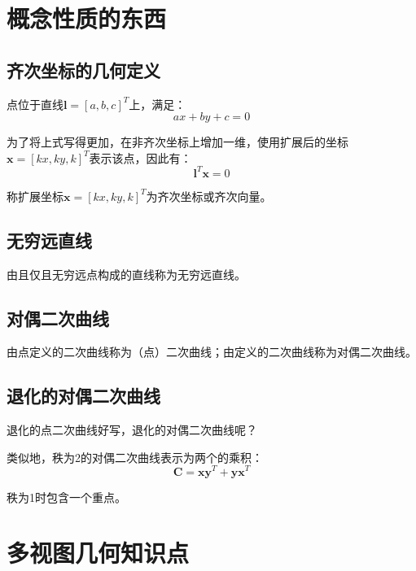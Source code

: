 \documentclass[11pt]{article}
\begin{document}

\setcounter{tocdepth}{3}
\tableofcontents
\newpage
{}
\section{概念性质的东西}
\subsection{齐次坐标的几何定义}
点位于直线$\mathbf{l}=[a,b,c]^T$上，满足：
\begin{equation*}
  ax+by+c=0
\end{equation*}\par
为了将上式写得更加，在非齐次坐标上增加一维，使用扩展后的坐标$\mathbf{x}=[kx,ky,k]^T$表示该点，因此有：
\begin{equation*}
  \mathbf{l}^T\mathbf{x}=0
\end{equation*}\par
称扩展坐标$\mathbf{x}=[kx,ky,k]^T$为齐次坐标或齐次向量。
\subsection{无穷远直线}
由且仅且无穷远点构成的直线称为无穷远直线。
\subsection{对偶二次曲线}
由点定义的二次曲线称为（点）二次曲线；由定义的二次曲线称为对偶二次曲线。
\subsection{退化的对偶二次曲线}
退化的点二次曲线好写，退化的对偶二次曲线呢？\par
类似地，秩为2的对偶二次曲线表示为两个的乘积：
\begin{equation*}
  \mathbf{C}=\mathbf{xy}^T+\mathbf{yx}^T
\end{equation*}\par
秩为1时包含一个重点。

\section{多视图几何知识点}
\end{document}
